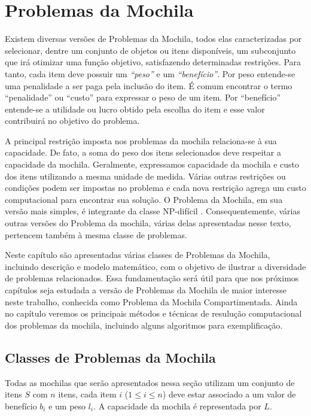 \pagestyle{plain}

\chapter{Problemas da Mochila} \label{sec:mochila}

Existem diversas versões de Problemas da Mochila, todos elas caracterizadas por selecionar, dentre um conjunto de objetos ou itens disponíveis, um subconjunto que irá otimizar uma função objetivo, satisfazendo determinadas restrições. Para tanto, cada item deve possuir um {\it ``peso''} e um {\it ``benefício''}. Por peso entende-se uma penalidade a ser paga pela inclusão do item. É comum encontrar o termo ``penalidade'' ou ``custo'' para expressar o peso de um item. Por ``benefício'' entende-se a utilidade ou lucro obtido pela escolha do item e esse valor contribuirá no objetivo do problema. 

A principal restrição imposta nos problemas da mochila relaciona-se à sua capacidade. De fato, a soma do peso dos itens selecionados deve respeitar a capacidade da mochila. Geralmente, expressamos capacidade da mochila e custo dos itens utilizando a mesma unidade de medida. Várias outras restrições ou condições podem ser impostas no problema e cada nova restrição agrega um custo computacional para encontrar sua solução. O Problema da Mochila, em sua versão mais simples, é integrante da classe NP-difícil \cite{GJ79}. Consequentemente, várias outras versões do Problema da mochila, várias delas apresentadas nesse texto, pertencem também à mesma classe de problemas.

Neste capítulo são apresentadas várias classes de Problemas da Mochila, incluindo descrição e modelo matemático, com o objetivo de ilustrar a diversidade de problemas relacionados. Essa fundamentação será útil para que nos próximos capítulos seja estudada a versão de Problemas da Mochila de maior interesse neste trabalho, conhecida como Problema da Mochila Compartimentada. Ainda no capítulo veremos os principais métodos e técnicas de resulução computacional dos problemas da mochila, incluindo alguns algoritmos para exemplificação. 

\section{Classes de Problemas da Mochila}

Todas as mochilas que serão apresentados nessa seção utilizam um conjunto de itens $S$ com $n$ itens, cada item $i$ ($1 \leq i \leq n$) deve estar associado a um valor de benefício $b_i$ e um peso $l_i$. A capacidade da mochila é representada por $L$. 


